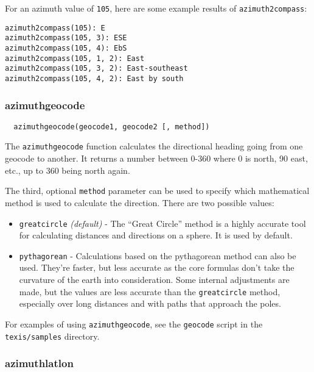 For an azimuth value of \verb`105`, here are some example results of
\verb`azimuth2compass`:

\begin{verbatim}
azimuth2compass(105): E
azimuth2compass(105, 3): ESE
azimuth2compass(105, 4): EbS
azimuth2compass(105, 1, 2): East
azimuth2compass(105, 3, 2): East-southeast
azimuth2compass(105, 4, 2): East by south
\end{verbatim}

\subsubsection{azimuthgeocode}

\begin{verbatim}
  azimuthgeocode(geocode1, geocode2 [, method])
\end{verbatim}

The \verb`azimuthgeocode` function calculates the directional heading
going from one geocode to another.  It returns a number between 0-360
where 0 is north, 90 east, etc., up to 360 being north again.

The third, optional \verb`method` parameter can be used to specify
which mathematical method is used to calculate the direction.  There
are two possible values:

\begin{itemize}
\item \verb`greatcircle` {\em(default)} - The ``Great Circle'' method
is a highly accurate tool for calculating distances and directions on
a sphere.  It is used by default.

\item \verb`pythagorean` - Calculations based on the pythagorean
method can also be used.  They're faster, but less accurate as the
core formulas don't take the curvature of the earth into
consideration.  Some internal adjustments are made, but the values are
less accurate than the \verb`greatcircle` method, especially over long
distances and with paths that approach the poles.
\end{itemize}

\EXAMPLE 

For examples of using \verb`azimuthgeocode`, see the \verb`geocode`
script in the \verb`texis/samples` directory.

\subsubsection{azimuthlatlon}

